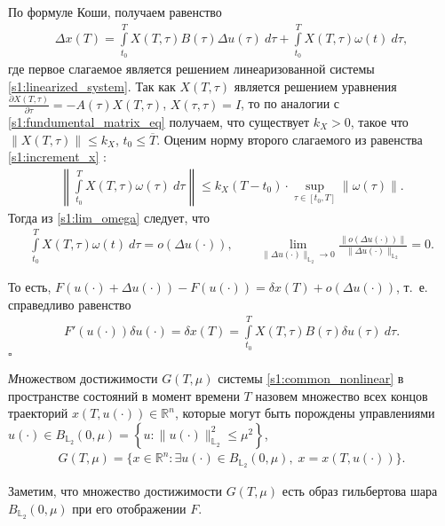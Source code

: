 \documentclass[../main.tex]{subfiles}
\begin{document}
По формуле Коши, получаем равенство
\begin{gather}\label{s1:increment_x}
	\Delta x(T) = \int\limits_{t_0}^{T} X(T, \tau) B(\tau) \Delta u(\tau) \ d\tau + \int\limits_{t_0}^{T} X(T, \tau) \omega(t) \ d\tau,
\end{gather}
где первое слагаемое является решением линеаризованной системы \eqref{s1:linearized_system}.
Так как $X(T, \tau) $ является решением уравнения $\frac{\partial X(T, \tau) }{\partial \tau} = -A(\tau)X(T, \tau)$, $X(\tau, \tau) = I$, то по аналогии с \eqref{s1:fundumental_matrix_eq} получаем, что существует $k_X > 0$, такое что $\|X(T, \tau) \| \leqslant k_X$, $t_0 \leqslant \overline{T} $.
Оценим норму второго слагаемого из равенства \eqref{s1:increment_x} :
\begin{gather*}
	\left\| \int\limits_{t_0}^T X(T,\tau)\omega(\tau) \ d\tau \right\| \leqslant k_X (T-t_0) \cdot \sup\limits_{\tau \in [t_0, T]} \|\omega(\tau)\|.
\end{gather*}
Тогда из \eqref{s1:lim_omega} следует, что 
\begin{gather*}
 \int\limits_{t_0}^{T} X(T, \tau) \omega(t) \ d\tau = o(\Delta u(\cdot)), \qquad \lim\limits_{\|\Delta u(\cdot) \|_{\mathbb{L}_2} \to 0} \frac{ \| o(\Delta u(\cdot)) \| }{\|\Delta u(\cdot) \|_{\mathbb{L}_2}} = 0.
\end{gather*}
 
То есть, $F(u(\cdot) + \Delta u(\cdot)) - F(u(\cdot)) = \delta x(T) + o(\Delta u(\cdot))$, т.~е. справедливо равенство
\begin{gather}\label{s1:lem2_assert}
 F'(u(\cdot))\delta u(\cdot) =\delta x(T) = \int\limits_{t_0}^{T} X(T, \tau) B(\tau) \delta u(\tau) \ d\tau.
\end{gather}
\hfill $\square$
 
\begin{definition}
 {\textit Множеством достижимости} $ G(T,\mu) $ системы \eqref{s1:common_nonlinear} в пространстве состояний в момент времени $ T $ назовем множество всех концов траекторий $ x(T, u(\cdot)) \in \mathbb{R}^n $, которые могут быть порождены управлениями $ u(\cdot) \in B_{\mathbb{L}_2}(0,\mu) =\left\lbrace u:\lVert u(\cdot)\rVert^2_{\mathbb{L}_2} \leqslant \mu^2\right\rbrace $,
 \begin{gather*}
 G(T,\mu)=\{x\in \mathbb{R}^n:\exists u(\cdot)\in B_{\mathbb{L}_2}(0,\mu),\; x=x(T,u(\cdot))\}.
 \end{gather*}
\end{definition}
 
Заметим, что множество достижимости $G(T,\mu)$ есть образ гильбертова шара $B_{\mathbb{L}_2}(0,\mu)$ при его отображении $F$.
 
\end{document}
